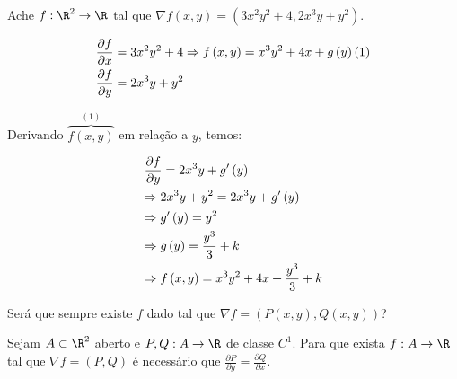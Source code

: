 \documentclass[11pt, oneside, a4paper]{gsm-l}
\begin{document}
\begin{exem}
    Ache $f:\R^2 \to \R$ tal que $\nabla f\left( {x,y} \right) = \left( {3x^2 y^2  + 4,2x^3 y + y^2 } \right)$.
\end{exem}

\begin{sol}
\[
\begin{gathered}
\frac{{\partial f}}
{{\partial x}} = 3x^2 y^2  + 4 \Rightarrow f\left( {x,y} \right) = x^3 y^2  + 4x + g\left( y \right)\left( 1 \right) \hfill \\
\frac{{\partial f}}
{{\partial y}} = 2x^3 y + y^2  \hfill \\
\end{gathered}
\]

    Derivando $\overbrace {f\left( {x,y} \right)}^{\left( 1 \right)}$ em relação a $y$, temos:

\[
\begin{gathered}
\frac{{\partial f}}
{{\partial y}} = 2x^3 y + g'\left( y \right) \hfill \\
\Rightarrow 2x^3 y + y^2  = 2x^3 y + g'\left( y \right) \hfill \\
\Rightarrow g'\left( y \right) = y^2  \hfill \\
\Rightarrow g\left( y \right) = \frac{{y^3 }}
{3} + k \hfill \\
\Rightarrow f\left( {x,y} \right) = x^3 y^2  + 4x + \frac{{y^3 }}
{3} + k \hfill \\
\end{gathered}
\]

\end{sol}

Será que sempre existe $f$ dado tal que $\nabla f = \left( {P\left( {x,y} \right),Q\left( {x,y} \right)} \right)$?

\begin{prop}
    Sejam $A \subset \R^2$ aberto e $P,Q:A \to \R$ de classe $C^1$. Para que exista $f:A \to \R$ tal que $\nabla f = \left( {P,Q} \right)$ é necessário que $\frac{{\partial P}}{{\partial y}} = \frac{{\partial Q}}{{\partial x}}$.
\end{prop}
\end{document}
